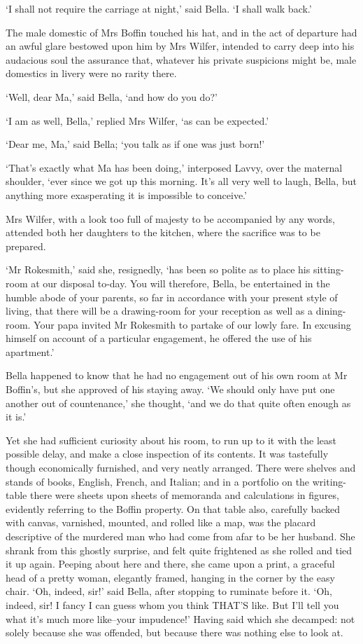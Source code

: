 ‘I shall not require the carriage at night,’ said Bella. ‘I shall walk
back.’

The male domestic of Mrs Boffin touched his hat, and in the act of
departure had an awful glare bestowed upon him by Mrs Wilfer, intended
to carry deep into his audacious soul the assurance that, whatever his
private suspicions might be, male domestics in livery were no rarity
there.

‘Well, dear Ma,’ said Bella, ‘and how do you do?’

‘I am as well, Bella,’ replied Mrs Wilfer, ‘as can be expected.’

‘Dear me, Ma,’ said Bella; ‘you talk as if one was just born!’

‘That’s exactly what Ma has been doing,’ interposed Lavvy, over the
maternal shoulder, ‘ever since we got up this morning. It’s all very
well to laugh, Bella, but anything more exasperating it is impossible to
conceive.’

Mrs Wilfer, with a look too full of majesty to be accompanied by any
words, attended both her daughters to the kitchen, where the sacrifice
was to be prepared.

‘Mr Rokesmith,’ said she, resignedly, ‘has been so polite as to place
his sitting-room at our disposal to-day. You will therefore, Bella, be
entertained in the humble abode of your parents, so far in accordance
with your present style of living, that there will be a drawing-room for
your reception as well as a dining-room. Your papa invited Mr Rokesmith
to partake of our lowly fare. In excusing himself on account of a
particular engagement, he offered the use of his apartment.’

Bella happened to know that he had no engagement out of his own room at
Mr Boffin’s, but she approved of his staying away. ‘We should only have
put one another out of countenance,’ she thought, ‘and we do that quite
often enough as it is.’

Yet she had sufficient curiosity about his room, to run up to it with
the least possible delay, and make a close inspection of its contents.
It was tastefully though economically furnished, and very neatly
arranged. There were shelves and stands of books, English, French, and
Italian; and in a portfolio on the writing-table there were sheets upon
sheets of memoranda and calculations in figures, evidently referring to
the Boffin property. On that table also, carefully backed with canvas,
varnished, mounted, and rolled like a map, was the placard descriptive
of the murdered man who had come from afar to be her husband. She shrank
from this ghostly surprise, and felt quite frightened as she rolled and
tied it up again. Peeping about here and there, she came upon a print, a
graceful head of a pretty woman, elegantly framed, hanging in the corner
by the easy chair. ‘Oh, indeed, sir!’ said Bella, after stopping to
ruminate before it. ‘Oh, indeed, sir! I fancy I can guess whom you
think THAT’S like. But I’ll tell you what it’s much more like--your
impudence!’ Having said which she decamped: not solely because she was
offended, but because there was nothing else to look at.

